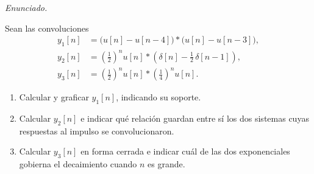 \documentclass[10pt,a4paper]{article}
\newenvironment{consigna}{%
  \par\smallskip
  \def\FrameCommand{\textcolor{utnblue!35}{\vrule width 2pt}\hspace{10pt}}%
  \MakeFramed{\advance\hsize-\width \FrameRestore}%
  \small\noindent\textit{Enunciado.}\enspace\ignorespaces
}{\endMakeFramed\par\smallskip}
\begin{document}
	\begin{consigna}
	Sean las convoluciones
	\begin{align*}
		y_1[n] &= \bigl(u[n]-u[n-4]\bigr) * \bigl(u[n]-u[n-3]\bigr), \\
		y_2[n] &= \left(\tfrac{1}{2}\right)^{\!n} u[n] *
		          \left(\delta[n]-\tfrac{1}{2}\,\delta[n-1]\right), \\
		y_3[n] &= \left(\tfrac{1}{2}\right)^{\!n} u[n] *
		          \left(\tfrac{1}{4}\right)^{\!n} u[n].
	\end{align*}
	\begin{enumerate}
		\item Calcular y graficar $y_1[n]$, indicando su soporte.
		\item Calcular $y_2[n]$ e indicar qué relación guardan entre sí
		los dos sistemas cuyas respuestas al impulso se convolucionaron.
		\item Calcular $y_3[n]$ en forma cerrada e indicar cuál de las dos
		exponenciales gobierna el decaimiento cuando $n$ es grande.
	\end{enumerate}
	\end{consigna}
\end{document}
